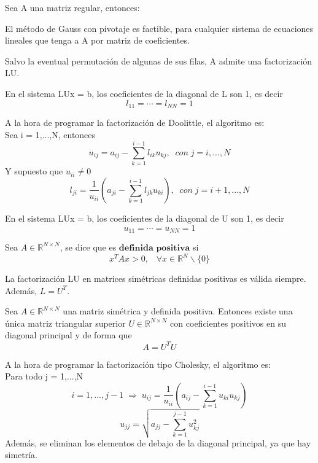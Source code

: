 			\begin{nth}
			Sea A una matriz regular, entonces:
				\begin{nlist}
				\item El método de Gauss con pivotaje es factible, para cualquier sistema de ecuaciones lineales que tenga a A por matriz de coeficientes.
				\item Salvo la eventual permutación de algunas de sus filas, A admite una factorización LU.
				\end{nlist}
			\end{nth}
			
			\begin{ndef}
			En el sistema LUx = b, los coeficientes de la diagonal de L son 1, es decir
			\[ l_{11} = \cdots = l_{NN} = 1 \]
			\end{ndef}
			
			A la hora de programar la factorización de Doolittle, el algoritmo es:\\
			Sea i = 1,...,N, entonces
			\[ u_{ij} = a_{ij} - \sum_{k=1}^{i-1} l_{ik}u_{kj}, \; \; con \; j = i,...,N \]
			Y supuesto que $u_{ii} \neq 0$
			\[ l_{ji} = \frac{1}{u_{ii}} \left( a_{ji} - \sum_{k=1}^{i-1} l_{jk}u_{ki} \right), \; \; con \; j = i+1,...,N \]			
			
			\begin{ndef}
			En el sistema LUx = b, los coeficientes de la diagonal de U son 1, es decir
			\[ u_{11} = \cdots = u_{NN} = 1 \]
			\end{ndef}
			
			\begin{ndef}
			Sea $A \in \mathbb{R}^{N \times N}$, se dice que es $\textbf{definida positiva}$ si
			\[ x^TAx > 0, \; \; \; \forall x \in \mathbb{R}^N \backslash \lbrace 0 \rbrace \]
			\end{ndef}
			
			La factorización LU en matrices simétricas definidas positivas es válida siempre. Además, $L = U^T$.
			
			\begin{ndef}
			Sea $A \in \mathbb{R}^{N \times N}$ una matriz simétrica y definida positiva. Entonces existe una única matriz triangular superior $U \in \mathbb{R}^{N \times N}$ con coeficientes positivos en su diagonal principal y de forma que
			\[ A = U^TU \]
			\end{ndef}
			
			A la hora de programar la factorización tipo Cholesky, el algoritmo es:\\
			Para todo j = 1,...,N
			\[ i = 1,...,j-1 \; \Rightarrow \; u_{ij} = \frac{1}{u_{ii}} \left( a_{ij} - \sum_{k=1}^{i-1} u_{ki}u_{kj} \right) \]
			\[ u_{jj} = \sqrt{a_{jj} - \sum_{k=1}^{j-1}u_{kj}^2} \]
			Además, se eliminan los elementos de debajo de la diagonal principal, ya que hay simetría.
			

